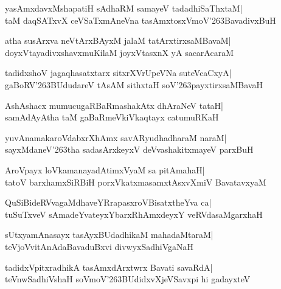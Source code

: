 \documentclass[twoside,12pt,openright]{book}
\def\S{\char'263}
\newcounter{shloka}[chapter]
\begin{document}
\begin{shloka}%
yasAmxdavxMshapatiH sAdhaRM samayeV tadadhiSaThxtaM|\\
taM daqSATxvX ceVSaTxmAneVna tasAmxtosxVmoV\S BavadivxBuH
\end{shloka}

\begin{shloka}%
atha susArxva neVtArxBAyxM jalaM tatArxtirxsaMBavaM|\\
doyxVtayadivxshavxmuKilaM joyxVtasxnX yA sacarAcaraM
\end{shloka}

\begin{shloka}%
tadidxshoV jagaqhasatxtarx sitxrXVrUpeVNa suteVcaCxyA|\\
gaBoRV\S BUdudareV tAsAM sithxtaH soV\S payxtirxsaMBavaH
\end{shloka}

\begin{shloka}%
AshAshacx mumucugaRBaRmashakAtx dhAraNeV tataH|\\
samAdAyAtha taM gaBaRmeVkiVkaqtayx catumuRKaH
\end{shloka}

\begin{shloka}%
yuvAnamakaroVdabxrXhAmx savARyudhadharaM naraM|\\
sayxMdaneV\S tha sadasArxkeyxV deVvashakitxmayeV parxBuH
\end{shloka}

\begin{shloka}%
AroVpayx loVkamanayadAtimxVyaM sa pitAmahaH|\\
tatoV barxhamxSiRBiH porxVkatxmasamxtAsxvXmiV BavatavxyaM
\end{shloka}

\begin{shloka}%
QuSiBideRVvagaMdhaveYRrapasxroVBisatxtheYva ca|\\
tuSuTxveV sAmadeYvateyxYbarxRhAmxdeyxY veRVdasaMgarxhaH
\end{shloka}

\begin{shloka}%
sUtxyamAnasayx tasAyxBUdadhikaM mahadaMtaraM|\\
teVjoVvitAnAdaBavaduBxvi divwyxSadhiVgaNaH
\end{shloka}

\begin{shloka}%
tadidxVpitxradhikA tasAmxdArxtwrx Bavati savaRdA|\\
teVnwSadhiVshaH soVmoV\S BUdidxvXjeVSavxpi hi gadayxteV
\end{shloka}
\end{document}

